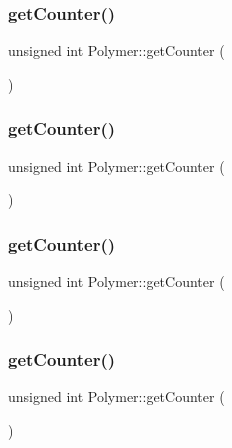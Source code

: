 \subsubsection{\texorpdfstring{get\+Counter()}{getCounter()}\hspace{0.1cm}{\footnotesize\ttfamily [3/10]}}
{\footnotesize\ttfamily unsigned int Polymer\+::get\+Counter (\begin{DoxyParamCaption}{ }\end{DoxyParamCaption})\hspace{0.3cm}{\ttfamily [inline]}}

\mbox{\label{classPolymer_a8346d821e5f8690d7816ba1d40036b69}} 
\subsubsection{\texorpdfstring{get\+Counter()}{getCounter()}\hspace{0.1cm}{\footnotesize\ttfamily [4/10]}}
{\footnotesize\ttfamily unsigned int Polymer\+::get\+Counter (\begin{DoxyParamCaption}{ }\end{DoxyParamCaption})\hspace{0.3cm}{\ttfamily [inline]}}

\mbox{\label{classPolymer_a8346d821e5f8690d7816ba1d40036b69}} 
\subsubsection{\texorpdfstring{get\+Counter()}{getCounter()}\hspace{0.1cm}{\footnotesize\ttfamily [5/10]}}
{\footnotesize\ttfamily unsigned int Polymer\+::get\+Counter (\begin{DoxyParamCaption}{ }\end{DoxyParamCaption})\hspace{0.3cm}{\ttfamily [inline]}}

\mbox{\label{classPolymer_a8346d821e5f8690d7816ba1d40036b69}} 
\subsubsection{\texorpdfstring{get\+Counter()}{getCounter()}\hspace{0.1cm}{\footnotesize\ttfamily [6/10]}}
{\footnotesize\ttfamily unsigned int Polymer\+::get\+Counter (\begin{DoxyParamCaption}{ }\end{DoxyParamCaption})\hspace{0.3cm}{\ttfamily [inline]}}

